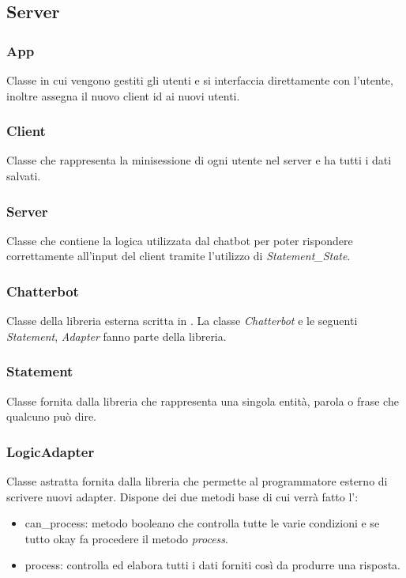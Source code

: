 \newpage

\subsection{Server}
\subsubsection{App} Classe in cui vengono gestiti gli utenti e si interfaccia direttamente con l'utente, inoltre assegna il nuovo client id ai nuovi utenti.
\subsubsection{Client} Classe che rappresenta la minisessione di ogni utente nel server e ha tutti i dati salvati.
\subsubsection{Server} Classe che contiene la logica utilizzata dal chatbot per poter rispondere correttamente all'input del client tramite l'utilizzo di \textit{Statement\_State}.
\subsubsection{Chatterbot} Classe della libreria esterna scritta in . La classe \textit{Chatterbot} e le seguenti \textit{Statement}, \textit{Adapter} fanno parte della libreria.
\subsubsection{Statement} Classe fornita dalla libreria  che rappresenta una singola entità, parola o frase che qualcuno può dire.
\subsubsection{LogicAdapter} Classe astratta fornita dalla libreria  che permette al programmatore esterno di scrivere nuovi adapter. Dispone dei due metodi base di cui verrà fatto l':
    \begin{itemize}
        \item can\_process: metodo booleano che controlla tutte le varie condizioni e se tutto okay fa procedere il metodo \textit{process}.
        \item process: controlla ed elabora tutti i dati forniti così da produrre una risposta.
    \end{itemize}
